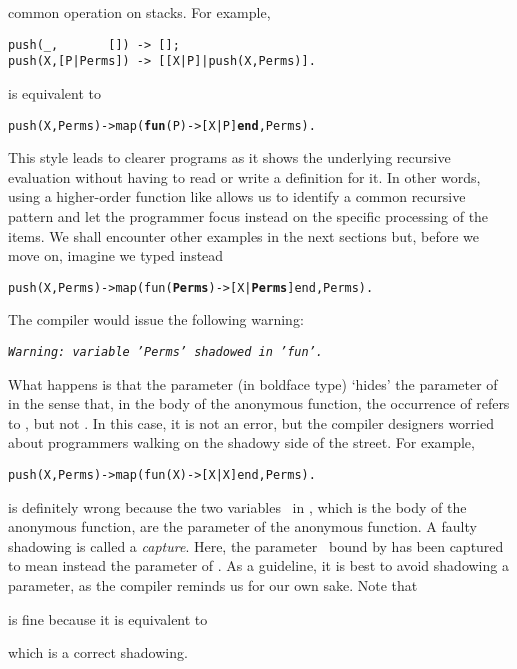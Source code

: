 common operation on stacks. For example,
\begin{verbatim}
push(_,       []) -> [];
push(X,[P|Perms]) -> [[X|P]|push(X,Perms)].
\end{verbatim}
is equivalent to
\begin{alltt}
push(X,Perms) -> map(\textbf{fun}(P) -> [X|P] \textbf{end},Perms).
\end{alltt}
This style leads to clearer programs as it shows the underlying
recursive evaluation without having to read or write a definition for
it. In other words, using a higher\hyp{}order function like
 allows us to identify a common recursive pattern and
let the programmer focus instead on the specific processing of the
items. We shall encounter other examples in the next sections but,
before we move on, imagine we typed instead
\begin{alltt}
push(X,Perms) -> map(fun(\textbf{Perms}) -> [X|\textbf{Perms}] end,Perms).
\end{alltt}
The \Erlang compiler would issue the following warning:
\begin{center}
\emph{\texttt{Warning: variable 'Perms' shadowed in
    'fun'.}}\label{shadowing}
\end{center}
What happens is that the parameter \textbf{} (in
boldface type) `hides' the parameter  of
 in the sense that, in the body of the anonymous
function, the occurrence of \textbf{} refers to
, but not . In
this case, it is not an error, but the compiler designers worried
about programmers walking on the shadowy side of the street. For
example,
\begin{alltt}
push(X,Perms) -> map(fun(X) -> [X|X] end,Perms).\hfill% \emph{Capture}
\end{alltt}
is definitely wrong because the two variables~ in
\erlcode{[X|X]}, which is the body of the anonymous function, are the
parameter of the anonymous function. A faulty shadowing is called a
\emph{capture}. Here, the parameter~ bound by
 has been captured to mean instead the
parameter of . As a guideline, it is best to avoid
shadowing a parameter, as the \Erlang compiler reminds us for our own
sake. Note that
\begin{center}
\end{center}
is fine because it is equivalent to
\begin{center}
\end{center}
which is a correct shadowing.

